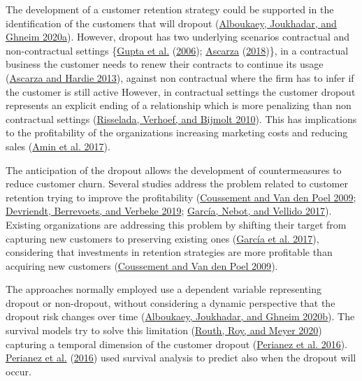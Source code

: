 \documentclass[
  12pt,
]{article}
\begin{document}
The development of a customer retention strategy could be supported in the
identification of the customers that will dropout (\protect\hyperlink{ref-alboukaey_dynamic_2020}{Alboukaey, Joukhadar, and Ghneim 2020a}).
However, dropout has two underlying scenarios contractual and non-contractual
settings \{\protect\hyperlink{ref-Gupta2006Modeling}{Gupta et al.} (\protect\hyperlink{ref-Gupta2006Modeling}{2006}); \protect\hyperlink{ref-ascarza_retention_2018}{Ascarza} (\protect\hyperlink{ref-ascarza_retention_2018}{2018})\},
in a contractual business the customer needs to renew their contracts to continue its usage
(\protect\hyperlink{ref-Ascarza_Hardie_2013}{Ascarza and Hardie 2013}), against non contractual where the firm has to infer if
the customer is still active
However, in contractual settings the customer dropout represents an explicit
ending of a relationship which is more penalizing than non contractual settings
(\protect\hyperlink{ref-risselada_staying_2010}{Risselada, Verhoef, and Bijmolt 2010}).
This has implications to the profitability of the organizations increasing marketing
costs and reducing sales (\protect\hyperlink{ref-amin_customer_2017}{Amin et al. 2017}).

The anticipation of the dropout allows the development of countermeasures to
reduce customer churn. Several studies address the problem related to customer
retention trying to improve the profitability (\protect\hyperlink{ref-coussement_improving_2009}{Coussement and Van den Poel 2009}; \protect\hyperlink{ref-devriendt_why_2019}{Devriendt, Berrevoets, and Verbeke 2019}; \protect\hyperlink{ref-garcia_intelligent_2017}{García, Nebot, and Vellido 2017}).
Existing organizations are addressing this problem by shifting their target from
capturing new customers to preserving existing ones (\protect\hyperlink{ref-garcia_intelligent_2017}{García et al. 2017}),
considering that investments in retention strategies are more profitable
than acquiring new customers (\protect\hyperlink{ref-coussement_improving_2009}{Coussement and Van den Poel 2009}).

The approaches normally employed use a dependent variable representing dropout
or non-dropout, without considering a dynamic perspective that the dropout risk
changes over time (\protect\hyperlink{ref-Alboukaey_dynamic_2020}{Alboukaey, Joukhadar, and Ghneim 2020b}). The survival models try to solve
this limitation (\protect\hyperlink{ref-routh_estimating_2020}{Routh, Roy, and Meyer 2020}) capturing a temporal dimension of the
customer dropout (\protect\hyperlink{ref-perianez_churn_2016}{Perianez et al. 2016}). \protect\hyperlink{ref-perianez_churn_2016}{Perianez et al.} (\protect\hyperlink{ref-perianez_churn_2016}{2016}) used survival
analysis to predict also when the dropout will occur.
\end{document}
